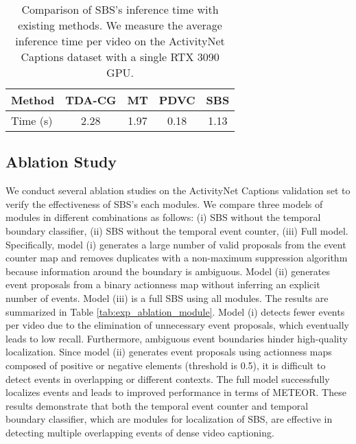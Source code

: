 \begin{table}[t]
  \centering
  \caption{
    {Comparison of SBS's inference time with existing methods.
        We measure the average inference time per video on the ActivityNet Captions dataset with a single RTX 3090 GPU.}
  }
  \begin{tabular}{l|cccc}
    \hline
    {Method}   & {TDA-CG \cite{wang2018bidirectional}} & {MT \cite{zhou2018end}} & {PDVC \cite{wang2021end}} & {{SBS}}  \\
    \hline
    {Time (s)} & {2.28}                                & {1.97}                  & {0.18}                    & {{1.13}} \\
    \hline
  \end{tabular}
  \label{tab:eval_inference_time}
\end{table}

\subsection{Ablation Study}
\label{subsec:exp_ablation}

We conduct several ablation studies on the ActivityNet Captions validation set to verify the effectiveness of SBS's each modules.
We compare three models of modules in different combinations as follows: (i) SBS without the temporal boundary classifier, (ii) SBS without the temporal event counter, (iii) Full model.
Specifically, model (i) generates a large number of valid proposals from the event counter map and removes duplicates with a non-maximum suppression algorithm because information around the boundary is ambiguous.
Model (ii) generates event proposals from a binary actionness map without inferring an explicit number of events.
Model (iii) is a full SBS using all modules.
The results are summarized in Table \ref{tab:exp_ablation_module}.
Model (i) detects fewer events per video due to the elimination of unnecessary event proposals, which eventually leads to low recall.
Furthermore, ambiguous event boundaries hinder high-quality localization.
Since model (ii) generates event proposals using actionness maps composed of positive or negative elements (threshold is 0.5), it is difficult to detect events in overlapping or different contexts.
The full model successfully localizes events and leads to improved performance in terms of METEOR.
These results demonstrate that both the temporal event counter and temporal boundary classifier, which are modules for localization of SBS, are effective in detecting multiple overlapping events of dense video captioning.

